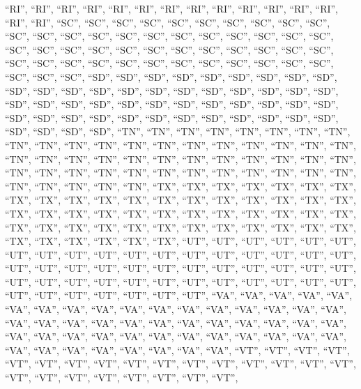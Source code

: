 \documentclass[
]{article}
\begin{document}
``RI'', ``RI'', ``RI'', ``RI'', ``RI'', ``RI'', ``RI'', ``RI'', ``RI'',
``RI'', ``RI'', ``RI'', ``RI'', ``RI'', ``RI'', ``SC'', ``SC'', ``SC'',
``SC'', ``SC'', ``SC'', ``SC'', ``SC'', ``SC'', ``SC'', ``SC'', ``SC'',
``SC'', ``SC'', ``SC'', ``SC'', ``SC'', ``SC'', ``SC'', ``SC'', ``SC'',
``SC'', ``SC'', ``SC'', ``SC'', ``SC'', ``SC'', ``SC'', ``SC'', ``SC'',
``SC'', ``SC'', ``SC'', ``SC'', ``SC'', ``SC'', ``SC'', ``SC'', ``SC'',
``SC'', ``SC'', ``SC'', ``SC'', ``SC'', ``SC'', ``SC'', ``SC'', ``SC'',
``SC'', ``SD'', ``SD'', ``SD'', ``SD'', ``SD'', ``SD'', ``SD'', ``SD'',
``SD'', ``SD'', ``SD'', ``SD'', ``SD'', ``SD'', ``SD'', ``SD'', ``SD'',
``SD'', ``SD'', ``SD'', ``SD'', ``SD'', ``SD'', ``SD'', ``SD'', ``SD'',
``SD'', ``SD'', ``SD'', ``SD'', ``SD'', ``SD'', ``SD'', ``SD'', ``SD'',
``SD'', ``SD'', ``SD'', ``SD'', ``SD'', ``SD'', ``SD'', ``SD'', ``SD'',
``SD'', ``SD'', ``SD'', ``SD'', ``SD'', ``TN'', ``TN'', ``TN'', ``TN'',
``TN'', ``TN'', ``TN'', ``TN'', ``TN'', ``TN'', ``TN'', ``TN'', ``TN'',
``TN'', ``TN'', ``TN'', ``TN'', ``TN'', ``TN'', ``TN'', ``TN'', ``TN'',
``TN'', ``TN'', ``TN'', ``TN'', ``TN'', ``TN'', ``TN'', ``TN'', ``TN'',
``TN'', ``TN'', ``TN'', ``TN'', ``TN'', ``TN'', ``TN'', ``TN'', ``TN'',
``TN'', ``TN'', ``TN'', ``TN'', ``TN'', ``TN'', ``TN'', ``TN'', ``TN'',
``TX'', ``TX'', ``TX'', ``TX'', ``TX'', ``TX'', ``TX'', ``TX'', ``TX'',
``TX'', ``TX'', ``TX'', ``TX'', ``TX'', ``TX'', ``TX'', ``TX'', ``TX'',
``TX'', ``TX'', ``TX'', ``TX'', ``TX'', ``TX'', ``TX'', ``TX'', ``TX'',
``TX'', ``TX'', ``TX'', ``TX'', ``TX'', ``TX'', ``TX'', ``TX'', ``TX'',
``TX'', ``TX'', ``TX'', ``TX'', ``TX'', ``TX'', ``TX'', ``TX'', ``TX'',
``TX'', ``TX'', ``TX'', ``TX'', ``UT'', ``UT'', ``UT'', ``UT'', ``UT'',
``UT'', ``UT'', ``UT'', ``UT'', ``UT'', ``UT'', ``UT'', ``UT'', ``UT'',
``UT'', ``UT'', ``UT'', ``UT'', ``UT'', ``UT'', ``UT'', ``UT'', ``UT'',
``UT'', ``UT'', ``UT'', ``UT'', ``UT'', ``UT'', ``UT'', ``UT'', ``UT'',
``UT'', ``UT'', ``UT'', ``UT'', ``UT'', ``UT'', ``UT'', ``UT'', ``UT'',
``UT'', ``UT'', ``UT'', ``UT'', ``UT'', ``UT'', ``UT'', ``UT'', ``VA'',
``VA'', ``VA'', ``VA'', ``VA'', ``VA'', ``VA'', ``VA'', ``VA'', ``VA'',
``VA'', ``VA'', ``VA'', ``VA'', ``VA'', ``VA'', ``VA'', ``VA'', ``VA'',
``VA'', ``VA'', ``VA'', ``VA'', ``VA'', ``VA'', ``VA'', ``VA'', ``VA'',
``VA'', ``VA'', ``VA'', ``VA'', ``VA'', ``VA'', ``VA'', ``VA'', ``VA'',
``VA'', ``VA'', ``VA'', ``VA'', ``VA'', ``VA'', ``VA'', ``VA'', ``VA'',
``VA'', ``VA'', ``VA'', ``VT'', ``VT'', ``VT'', ``VT'', ``VT'', ``VT'',
``VT'', ``VT'', ``VT'', ``VT'', ``VT'', ``VT'', ``VT'', ``VT'', ``VT'',
``VT'', ``VT'', ``VT'', ``VT'', ``VT'', ``VT'', ``VT'', ``VT'', ``VT'',
\end{document}
